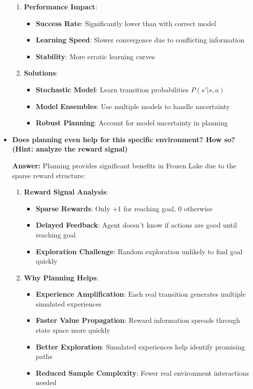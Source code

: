 \begin{itemize}
\begin{enumerate}
        \item \textbf{Performance Impact}:
        \begin{itemize}
            \item \textbf{Success Rate}: Significantly lower than with correct model
            \item \textbf{Learning Speed}: Slower convergence due to conflicting information
            \item \textbf{Stability}: More erratic learning curves
        \end{itemize}
        
        \item \textbf{Solutions}:
        \begin{itemize}
            \item \textbf{Stochastic Model}: Learn transition probabilities $P(s'|s,a)$
            \item \textbf{Model Ensembles}: Use multiple models to handle uncertainty
            \item \textbf{Robust Planning}: Account for model uncertainty in planning
        \end{itemize}
    \end{enumerate}
    
    \item \textbf{Does planning even help for this specific environment? How so? (Hint: analyze the reward signal)}
    
    \textbf{Answer:} Planning provides significant benefits in Frozen Lake due to the sparse reward structure:
    
    \begin{enumerate}
        \item \textbf{Reward Signal Analysis}:
        \begin{itemize}
            \item \textbf{Sparse Rewards}: Only +1 for reaching goal, 0 otherwise
            \item \textbf{Delayed Feedback}: Agent doesn't know if actions are good until reaching goal
            \item \textbf{Exploration Challenge}: Random exploration unlikely to find goal quickly
        \end{itemize}
        
        \item \textbf{Why Planning Helps}:
        \begin{itemize}
            \item \textbf{Experience Amplification}: Each real transition generates multiple simulated experiences
            \item \textbf{Faster Value Propagation}: Reward information spreads through state space more quickly
            \item \textbf{Better Exploration}: Simulated experiences help identify promising paths
            \item \textbf{Reduced Sample Complexity}: Fewer real environment interactions needed
        \end{itemize}
        

\end{enumerate}
\end{itemize}
